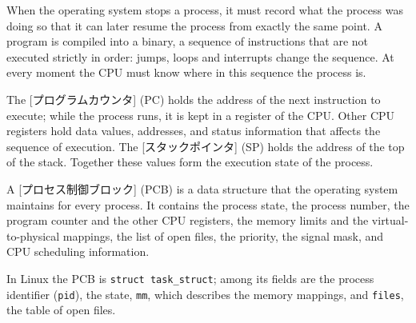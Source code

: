 \documentclass[../main.tex]{subfiles}
\begin{document}
When the operating system stops a process, it must record what the process
was doing so that it can later resume the process from exactly the same
point.  A program is compiled into a binary, a sequence of
instructions that are not executed strictly in order: jumps, loops and
interrupts change the sequence.  At every moment the CPU must know where in
this sequence the process is.

The [プログラムカウンタ]
(PC) holds the address of the next instruction to execute; while the
process runs, it is kept in a register of the CPU.  Other CPU registers hold
data values, addresses, and status information that affects the sequence of
execution.  The [スタックポインタ] (SP) holds the
address of the top of the stack.  Together these values form the execution
state of the process.

\begin{definition}
  A [プロセス制御ブロック]
  (PCB) is a data structure that the operating system maintains for every
  process.  It contains the process state, the process number, the program
  counter and the other CPU registers, the memory limits and the
  virtual-to-physical mappings, the list of open files, the priority, the
  signal mask, and CPU scheduling information.
\end{definition}

In Linux the PCB is \texttt{struct task\_struct}; among its fields are the
process identifier (\texttt{pid}), the state, \texttt{mm}, which describes
the memory mappings, and \texttt{files}, the table of open files.
\end{document}
